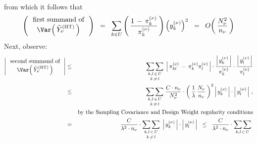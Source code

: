 from which it follows that
\begin{equation*}
\left(\,\begin{array}{c}
    \textnormal{first summand of}
    \\
    \Var\!\left(\,\widehat{Y}^{\textnormal{(HT)}}_{\nu}\,\right)
    \end{array}\,\right)
\;\; = \;\;
    \underset{k \in U}{\sum}
    \left(\,
        \dfrac{
            1 \,-\, \pi^{(\nu)}_{k}
            }{
            \pi^{(\nu)}_{k}
            }
        \,\right)
    \left(y^{(\nu)}_{k}\right)^{2}
\;\; = \;\;
    O\!\left(\,\dfrac{N_{\nu}^{2}}{n_{\nu}}\,\right)
\end{equation*}
Next, observe:
\begin{eqnarray*}
\left\vert\,\begin{array}{c}
    \textnormal{second summand of}
    \\
    \Var\!\left(\,\widehat{Y}^{\textnormal{(HT)}}_{\nu}\,\right)
    \end{array}\,\right\vert
& \leq &
    \underset{k\,\neq\,l}{\underset{k,l\,\in\,U}{\sum\sum}}\;
    \left\vert\,
        \pi^{(\nu)}_{kl}
        \, - \,
        \pi^{(\nu)}_{k}\pi^{(\nu)}_{l}
        \,\right\vert
    \cdot
    \dfrac{\left\vert\,y^{(\nu)}_{k}\,\right\vert}{\pi^{(\nu)}_{k}}
    \cdot
    \dfrac{\left\vert\,y^{(\nu)}_{l}\,\right\vert}{\pi^{(\nu)}_{l}}
\\
& \leq &
    \underset{k\,\neq\,l}{\underset{k,l\,\in\,U}{\sum\sum}}\;
    \dfrac{C \cdot n_{\nu}}{N_{\nu}^{2}}
    \cdot
    \left(\,\dfrac{1}{\lambda}\,\dfrac{N_{\nu}}{n_{\nu}}\,\right)^{2}
    \left\vert\,y^{(\nu)}_{k}\,\right\vert
    \cdot
    \left\vert\,y^{(\nu)}_{l}\,\right\vert\,,
\\
&&
    \textnormal{by the Sampling Covariance and Design Weight regularity conditions}
\\
& = &
    \dfrac{C}{\lambda^{2} \cdot n_{\nu}}
    \cdot
    \underset{k\,\neq\,l}{\underset{k,l\,\in\,U}{\sum\sum}}\;
    \left\vert\,y^{(\nu)}_{k}\,\right\vert
    \cdot
    \left\vert\,y^{(\nu)}_{l}\,\right\vert
\;\; \leq \;\;
    \dfrac{C}{\lambda^{2} \cdot n_{\nu}}
    \cdot
    \underset{k,l\,\in\,U}{\sum\sum}\;

\end{eqnarray*}

